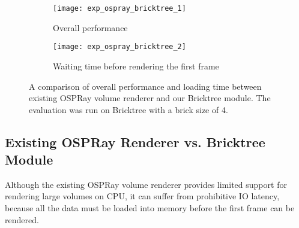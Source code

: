 \begin{figure}[h]
    \centering
    \begin{subfigure}[b]{0.9\columnwidth}
        \texttt{[image: exp\_ospray\_bricktree\_1]}
        \vspace{-1em}
        \caption{Overall performance}
        \label{fig:exp_ospray_bricktree_framerate}
    \end{subfigure}
    \begin{subfigure}[b]{0.9\columnwidth}
        \texttt{[image: exp\_ospray\_bricktree\_2]}
        \vspace{-1em}
        \caption{Waiting time before rendering the first frame}
        \label{fig:exp_ospray_bricktree_waitingtime}
    \end{subfigure}
	\caption{\label{fig:exp_ospray_bricktree}%
	A comparison of overall performance and loading time between existing OSPRay volume renderer and our Bricktree module. The evaluation was run on Bricktree with a brick size of 4.}
	\vspace{-0.5em}
\end{figure}

\subsection{Existing OSPRay Renderer vs. Bricktree Module}
Although the existing OSPRay volume renderer provides limited support for rendering large 
volumes on CPU, it can suffer from prohibitive IO latency, because all 
the data must be loaded into memory before the first frame can be rendered.


